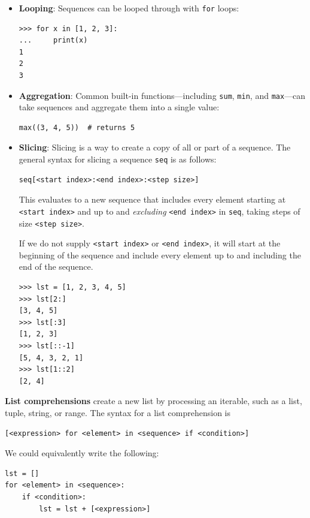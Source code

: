 \begin{itemize}
	\item \textbf{Looping}: Sequences can be looped through with \lstinline{for} loops:
	\vspace{-0.5em} %
	\begin{lstlisting}
>>> for x in [1, 2, 3]:
...     print(x)
1
2
3
	\end{lstlisting}

	\item \textbf{Aggregation}: Common built-in functions---including \lstinline{sum}, \lstinline{min}, and \lstinline{max}---can take sequences and aggregate them into a single value:
	\begin{lstlisting}
max((3, 4, 5))  # returns 5
	\end{lstlisting}

	\item \textbf{Slicing}: Slicing is a way to create a copy of all or part of a sequence. The general syntax for slicing a sequence \lstinline{seq} is as follows:
	\begin{lstlisting}
seq[<start index>:<end index>:<step size>]
	\end{lstlisting}

This evaluates to a new sequence that includes every element starting at \lstinline{<start index>} and up to and \textit{excluding} \lstinline{<end index>} in \lstinline{seq}, taking steps of size \lstinline{<step size>}. 

If we do not supply \lstinline{<start index>} or \lstinline{<end index>}, it will start at the beginning of the sequence and include every element up to and including the end of the sequence. 

\begin{lstlisting}
>>> lst = [1, 2, 3, 4, 5]
>>> lst[2:] 
[3, 4, 5]
>>> lst[:3] 
[1, 2, 3]
>>> lst[::-1] 
[5, 4, 3, 2, 1]
>>> lst[1::2] 
[2, 4]
\end{lstlisting}

\end{itemize}
\textbf{List comprehensions} create a new list by processing an iterable, such as a list, tuple, string, or range. The syntax for a list comprehension is
   \begin{lstlisting}
[<expression> for <element> in <sequence> if <condition>]
   \end{lstlisting}

\begin{blocksection}
We could equivalently write the following: 
\begin{lstlisting}
lst = []
for <element> in <sequence>:
    if <condition>:
        lst = lst + [<expression>] 
\end{lstlisting}
\end{blocksection}

